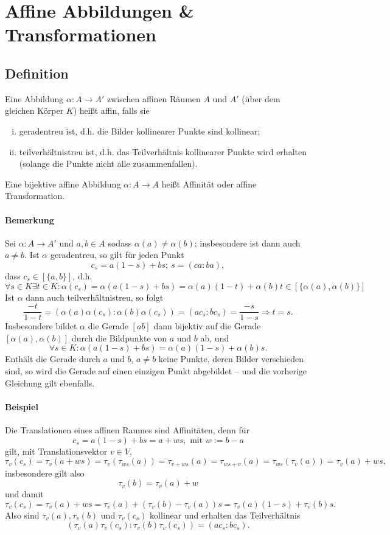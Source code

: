 
\section{Affine Abbildungen \& Transformationen}
\subsection{Definition}
	\begin{Definition}
		Eine Abbildung $ \alpha:A\to A' $ zwischen affinen Räumen $ A $ und $ A' $ (über dem gleichen Körper $ K $) heißt affin, falls sie
			\begin{enumerate}[(i)]
				\item geradentreu ist, d.h. die Bilder kollinearer Punkte sind kollinear;
				\item teilverhältnistreu ist, d.h. das Teilverhältnis kollinearer Punkte wird erhalten (solange die Punkte nicht alle zusammenfallen).
			\end{enumerate}
		Eine bijektive affine Abbildung $ \alpha:A\to A $ heißt Affinität oder affine Transformation.
	\end{Definition}
	
\paragraph{Bemerkung}
	Sei $ \alpha:A\to A' $ und $ a,b\in A $ sodass $ \alpha(a)\neq \alpha(b) $; insbesondere ist dann auch $ a\neq b $. Ist $ \alpha $ geradentreu, so gilt für jeden Punkt
		\[ c_s = a(1-s)+bs;\ s=(ca:ba), \]
	dass $ c_s\in [\{a,b\}] $, d.h.
		\[ \forall s\in K\exists t\in K:\alpha(c_s) = \alpha(a(1-s)+bs) = \alpha(a)(1-t)+\alpha(b)t \in [\{\alpha(a),\alpha(b)\}] \]
	Ist $ \alpha $ dann auch teilverhältnistreu, so folgt
		\[ \frac{-t}{1-t} = (\alpha(a)\alpha(c_s):\alpha(b)\alpha(c_s)) = (ac_s:bc_s) = \frac{-s}{1-s} \Rightarrow t = s. \]
	Insbesondere bildet $ \alpha $ die Gerade $ [ab] $ dann bijektiv auf die Gerade $ [\alpha(a),\alpha(b)] $ durch die Bildpunkte von $ a $ und $ b $ ab, und 
		\[ \forall s\in K:\alpha(a(1-s)+bs)=\alpha(a)(1-s)+\alpha(b)s. \]
	Enthält die Gerade durch $ a $ und $ b $, $ a\neq b $ keine Punkte, deren Bilder verschieden sind, so wird die Gerade auf einen einzigen Punkt abgebildet -- und die vorherige Gleichung gilt ebenfalls.
	
\paragraph{Beispiel}
	Die Translationen eines affinen Raumes sind Affinitäten, denn für
		\[ c_s = a(1-s)+bs = a + ws, \text{ mit } w:=b-a \]
	gilt, mit Translationsvektor $ v\in V $,
		\[ \tau_v(c_s) = \tau_v(a+ws) = \tau_v(\tau_{ws}(a)) = \tau_{v+ws}(a) = \tau_{ws+v}(a) = \tau_{ws}(\tau_v(a)) =  \tau_v(a) + ws, \]
	insbesondere gilt also
		\[ \tau_v(b) = \tau_v(a)+w \]
	und damit
		\[ \tau_v(c_s) = \tau_v(a)+ws = \tau_v(a)+(\tau_v(b)-\tau_v(a))s = \tau_v(a)(1-s)+\tau_v(b)s.\]
	Also sind $ \tau_v(a),\tau_v(b) $ und $ \tau_v(c_s) $ kollinear und erhalten das Teilverhältnis
		\[ (\tau_v(a)\tau_v(c_s):\tau_v(b)\tau_v(c_s)) = (ac_s:bc_s). \]
		
